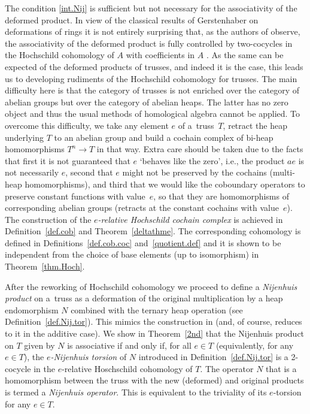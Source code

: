 \documentclass[pdftex]{sigma}
\numberwithin{equation}{section}
\begin{document}
The condition \eqref{int.Nij} is sufficient but not necessary for the associativity of the deformed product. In view of the classical results of Gerstenhaber on deformations of rings \cite{7} it is not entirely surprising that, as the authors of \cite{4} observe, the associativity of the deformed product is fully controlled by two-cocycles in the Hochschild cohomology of $A$ with coefficients in $A$ \cite{Hoch}. As the same can be expected of the deformed products of trusses, and indeed it is the case, this leads us to developing rudiments of the Hochschild cohomology for trusses. The main difficulty here is that the category of trusses is not enriched over the category of abelian groups but over the category of abelian heaps. The latter has no zero object and thus the usual methods of homological algebra cannot be applied. To overcome this difficulty, we take
any element $e$ of a~truss~$T$, retract the heap underlying $T$ to an abelian group and build a cochain complex of bi-heap homomorphisms $T^n\to T$ in that way. Extra care should be taken due to the facts that first it is not guaranteed that $e$ `behaves like the zero', i.e., the product $ae$ is not necessarily $e$, second that $e$ might not be preserved by the cochains (multi-heap homomorphisms), and third that we would like the coboundary operators to preserve constant functions with value~$e$, so that they are homomorphisms of corresponding abelian groups (retracts at the constant cochains with value~$e$). The construction of the \textit{$e$-relative Hochschild cochain complex} is achieved in Definition~\ref{def.cob} and Theorem~\ref{deltathme}. The corresponding cohomology is defined in Definitions~\ref{def.cob.coc} and~\ref{quotient.def} and it is shown to be independent from the choice of base elements (up to isomorphism) in Theorem~\ref{thm.Hoch}.

After the reworking of Hochschild cohomology we proceed to define a \textit{Nijenhuis product} on a~truss as a deformation of the original multiplication by a heap endomorphism $N$ combined with the ternary heap operation (see Definition~\ref{def.Nij.tor}). This mimics the construction in \cite{4} (and, of course, reduces to it in the additive case). We show in Theorem~\ref{2nd} that the Nijenhuis product on $T$ given by $N$ is associative if and only if, for all $e\in T$ (equivalently, for any $e\in T$), the \textit{$e$-Nijenhuis torsion} of $N$ introduced in Definition~\ref{def.Nij.tor} is a 2-cocycle in the $e$-relative Hoschschild cohomology of $T$. The operator $N$ that is a homomorphism between the truss with the new (deformed) and original products is termed a \textit{Nijenhuis operator}. This is equivalent to the triviality of its $e$-torsion for any $e\in T$.
\end{document}
